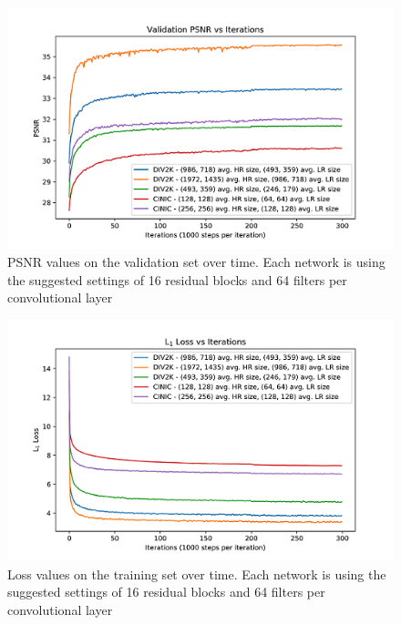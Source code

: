 \documentclass[conference]{IEEEtran}
\begin{document}
\begin{figure}[htbp]
  \centerline{\includegraphics{baseline-psnr.png}}
  \caption{PSNR values on the validation set over time. Each network is using the suggested settings of 16 residual blocks and 64 filters per convolutional layer}
  \label{fig:baseline-psnr}
\end{figure}

\begin{figure}[htbp]
  \centerline{\includegraphics{baseline-loss.png}}
  \caption{Loss values on the training set over time. Each network is using the suggested settings of 16 residual blocks and 64 filters per convolutional layer}
  \label{fig:baseline-loss}
\end{figure}
\end{document}
